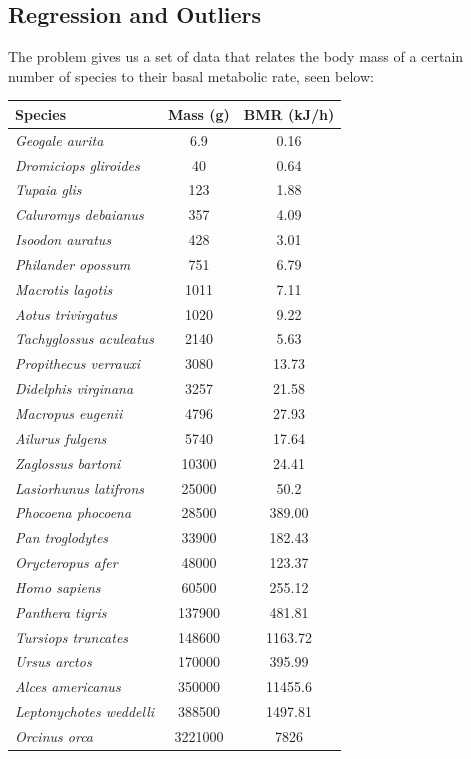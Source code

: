 \documentclass[10pt,letterpaper]{article}
\begin{document}
		\subsection{Regression and Outliers}
			The problem gives us a set of data that relates the body mass of a certain number of species to their basal metabolic rate, seen below:
			\begin{center}
				\begin{tabular}{l c c}
					Species & Mass (g) & BMR (kJ/h) \\
					\hline
					\emph{Geogale aurita} & 6.9 & 0.16 \\
					\emph{Dromiciops gliroides} & 40 & 0.64 \\
					\emph{Tupaia glis} & 123 & 1.88 \\
					\emph{Caluromys debaianus} & 357 & 4.09 \\
					\emph{Isoodon auratus} & 428 & 3.01 \\
					\emph{Philander opossum} & 751 & 6.79 \\
					\emph{Macrotis lagotis} & 1011 & 7.11 \\
					\emph{Aotus trivirgatus} & 1020 & 9.22 \\
					\emph{Tachyglossus aculeatus} & 2140 & 5.63 \\
					\emph{Propithecus verrauxi} & 3080 & 13.73 \\
					\emph{Didelphis virginana} & 3257 & 21.58 \\
					\emph{Macropus eugenii} & 4796 & 27.93 \\
					\emph{Ailurus fulgens} & 5740 & 17.64 \\
					\emph{Zaglossus bartoni} & 10300 & 24.41 \\
					\emph{Lasiorhunus latifrons} & 25000 & 50.2 \\
					\emph{Phocoena phocoena} & 28500 & 389.00 \\
					\emph{Pan troglodytes} & 33900 & 182.43 \\
					\emph{Orycteropus afer} & 48000 & 123.37 \\
					\emph{Homo sapiens} & 60500 & 255.12 \\
					\emph{Panthera tigris} & 137900 & 481.81 \\
					\emph{Tursiops truncates} & 148600 & 1163.72 \\
					\emph{Ursus arctos} & 170000 & 395.99 \\
					\emph{Alces americanus} & 350000 & 11455.6 \\
					\emph{Leptonychotes weddelli} & 388500 & 1497.81 \\
					\emph{Orcinus orca} & 3221000 & 7826
				\end{tabular}
			\end{center}
\end{document}
